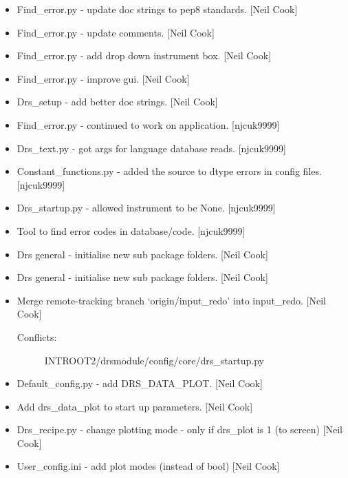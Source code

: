 \documentclass[a4paper,10pt,english]{report}
\begin{document}
\begin{itemize}
\item {} 
Find\_error.py - update doc strings to pep8 standards. {[}Neil Cook{]}

\item {} 
Find\_error.py - update comments. {[}Neil Cook{]}

\item {} 
Find\_error.py - add drop down instrument box. {[}Neil Cook{]}

\item {} 
Find\_error.py - improve gui. {[}Neil Cook{]}

\item {} 
Drs\_setup - add better doc strings. {[}Neil Cook{]}

\item {} 
Find\_error.py - continued to work on application. {[}njcuk9999{]}

\item {} 
Drs\_text.py - got args for language database reads. {[}njcuk9999{]}

\item {} 
Constant\_functions.py - added the source to dtype errors in config
files. {[}njcuk9999{]}

\item {} 
Drs\_startup.py - allowed instrument to be None. {[}njcuk9999{]}

\item {} 
Tool to find error codes in database/code. {[}njcuk9999{]}

\item {} 
Drs general - initialise new sub package folders. {[}Neil Cook{]}

\item {} 
Drs general - initialise new sub package folders. {[}Neil Cook{]}

\item {} 
Merge remote-tracking branch ‘origin/input\_redo’ into input\_redo.
{[}Neil Cook{]}
\begin{description}
\item[{Conflicts:}] \leavevmode
INTROOT2/drsmodule/config/core/drs\_startup.py

\end{description}

\item {} 
Default\_config.py - add DRS\_DATA\_PLOT. {[}Neil Cook{]}

\item {} 
Add drs\_data\_plot to start up parameters. {[}Neil Cook{]}

\item {} 
Drs\_recipe.py - change plotting mode - only if drs\_plot is 1 (to
screen) {[}Neil Cook{]}

\item {} 
User\_config.ini - add plot modes (instead of bool) {[}Neil Cook{]}

\end{itemize}
\end{document}
